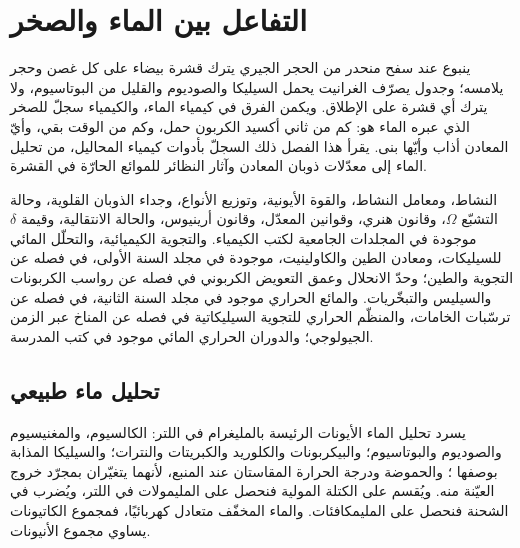 \chapter{التفاعل بين الماء والصخر}\label{ch:b3:water-rock-interaction}

ينبوع عند سفح منحدر من الحجر الجيري يترك قشرة بيضاء على كل
غصن وحجر يلامسه؛ وجدول يصرّف الغرانيت يحمل السيليكا والصوديوم
والقليل من البوتاسيوم، ولا يترك أي قشرة على الإطلاق. ويكمن الفرق في
كيمياء الماء، والكيمياء سجلّ للصخر الذي عبره الماء
هو: كم من ثاني أكسيد الكربون حمل، وكم من الوقت بقي، وأيّ
المعادن أذاب وأيّها بنى. يقرأ هذا الفصل ذلك السجلّ بأدوات
كيمياء المحاليل، من تحليل الماء إلى معدّلات
ذوبان المعادن وآثار النظائر للموائع الحارّة في القشرة.

\begin{recall}
النشاط، ومعامل النشاط، والقوة الأيونية، وتوزيع الأنواع، وجداء الذوبان
القلوية، وحالة التشبّع $\Omega$، وقانون هنري، وقوانين المعدّل،
وقانون أرينيوس، والحالة الانتقالية، وقيمة $\delta$ موجودة في
المجلدات الجامعية لكتب الكيمياء. والتجوية الكيميائية، والتحلّل المائي
للسيليكات، ومعادن الطين والكاولينيت، موجودة في مجلد السنة الأولى، في فصله
عن التجوية والطين؛ وحدّ الانحلال وعمق التعويض
الكربوني في فصله عن رواسب الكربونات والسيليس والتبخّريات. والمائع الحراري
موجود في مجلد السنة الثانية، في فصله عن ترسّبات الخامات،
والمنظّم الحراري للتجوية السيليكاتية في فصله عن المناخ عبر
الزمن الجيولوجي؛ والدوران الحراري المائي موجود في كتب المدرسة.
\end{recall}

\section{تحليل ماء طبيعي}\label{sec:b3:water-rock-interaction:analysis}

يسرد تحليل الماء الأيونات الرئيسة بالمليغرام في اللتر: الكالسيوم،
والمغنيسيوم والصوديوم والبوتاسيوم؛ والبيكربونات والكلوريد والكبريتات والنترات؛
والسيليكا المذابة بوصفها ؛ والحموضة ودرجة الحرارة المقاستان عند
المنبع، لأنهما يتغيّران بمجرّد خروج العيّنة منه. ويُقسم على الكتلة
المولية فنحصل على المليمولات في اللتر، ويُضرب في الشحنة فنحصل على
المليمكافئات. والماء المخفّف متعادل كهربائيًا، فمجموع
الكاتيونات يساوي مجموع الأنيونات.

